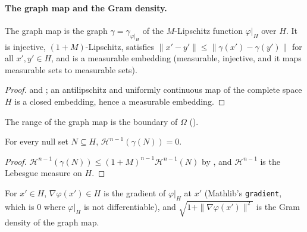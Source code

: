 \paragraph{The graph map and the Gram density.}

\begin{lemma}
\label{lem:graph-map-area}
\leanok
{}
The graph map is the graph $\gamma = \gamma_{\varphi|_H}$ of the $M$-Lipschitz function
$\varphi|_H$ over $H$. It is injective, $(1 + M)$-Lipschitz, satisfies
$\|x' - y'\| \leq \|\gamma(x') - \gamma(y')\|$ for all $x', y' \in H$, and is a measurable
embedding (measurable, injective, and it maps measurable sets to measurable sets).
\end{lemma}

\begin{proof}
\leanok
{} and ; an antilipschitz and uniformly continuous map of
the complete space $H$ is a closed embedding, hence a measurable embedding.
\end{proof}

The range of the graph map is the boundary of $\Omega$ ().

\begin{lemma}
\label{lem:graph-map-null}
\leanok
{}
For every null set $N \subseteq H$, $\mathcal H^{n-1}(\gamma(N)) = 0$.
\end{lemma}

\begin{proof}
\leanok
$\mathcal H^{n-1}(\gamma(N)) \leq (1 + M)^{n-1} \mathcal H^{n-1}(N)$ by
, and $\mathcal H^{n-1}$ is the Lebesgue measure on $H$.
\end{proof}

\begin{definition}
\label{def:graph-gradient}
\leanok
{}
For $x' \in H$, $\nabla\varphi(x') \in H$ is the gradient of $\varphi|_H$ at $x'$ (Mathlib's
\texttt{gradient}, which is $0$ where $\varphi|_H$ is not differentiable), and
$\sqrt{1 + \|\nabla\varphi(x')\|^2}$ is the Gram density of the graph map.
\end{definition}

